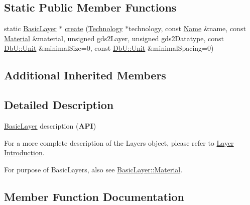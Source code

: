 \subsection*{Static Public Member Functions}
\begin{DoxyCompactItemize}
\item 
static \hyperlink{classHurricane_1_1BasicLayer}{Basic\+Layer} $\ast$ \hyperlink{classHurricane_1_1BasicLayer_a76ccb64abaaf9c834c8ee8f010d5d24f}{create} (\hyperlink{classHurricane_1_1Technology}{Technology} $\ast$technology, const \hyperlink{classHurricane_1_1Name}{Name} \&name, const \hyperlink{classHurricane_1_1BasicLayer_1_1Material}{Material} \&material, unsigned gds2\+Layer, unsigned gds2\+Datatype, const \hyperlink{group__DbUGroup_ga4fbfa3e8c89347af76c9628ea06c4146}{Db\+U\+::\+Unit} \&minimal\+Size=0, const \hyperlink{group__DbUGroup_ga4fbfa3e8c89347af76c9628ea06c4146}{Db\+U\+::\+Unit} \&minimal\+Spacing=0)
\end{DoxyCompactItemize}
\subsection*{Additional Inherited Members}


\subsection{Detailed Description}
\hyperlink{classHurricane_1_1BasicLayer}{Basic\+Layer} description ({\bfseries A\+PI}) 

For a more complete description of the Layers object, please refer to \hyperlink{classHurricane_1_1Layer_secLayerIntro}{Layer Introduction}.

For purpose of Basic\+Layers, also see \hyperlink{classHurricane_1_1BasicLayer_1_1Material}{Basic\+Layer\+::\+Material}. 

\subsection{Member Function Documentation}
\mbox{\label{classHurricane_1_1BasicLayer_a76ccb64abaaf9c834c8ee8f010d5d24f}} 

